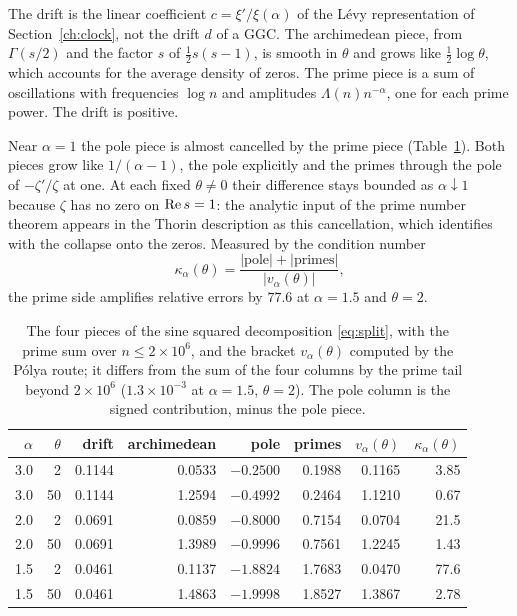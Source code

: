 The drift is the linear coefficient $c=\xi'/\xi(\alpha)$ of the L\'evy representation of Section~\ref{ch:clock}, not the drift $d$ of a GGC. The archimedean piece, from $\Gamma(s/2)$ and the factor $s$ of $\frac12s(s-1)$, is smooth in $\theta$ and grows like $\frac12\log\theta$, which accounts for the average density of zeros. The prime piece is a sum of oscillations with frequencies $\log n$ and amplitudes $\Lambda(n)n^{-\alpha}$, one for each prime power. The drift is positive.

Near $\alpha=1$ the pole piece is almost cancelled by the prime piece (Table~\ref{tab:split}). Both pieces grow like $1/(\alpha-1)$, the pole explicitly and the primes through the pole of $-\zeta'/\zeta$ at one. At each fixed $\theta\ne0$ their difference stays bounded as $\alpha\downarrow1$ because $\zeta$ has no zero on $\operatorname{Re} s=1$: the analytic input of the prime number theorem appears in the Thorin description as this cancellation, which \cite[Section 8.2]{P26} identifies with the collapse onto the zeros. Measured by the condition number
\[
\kappa_\alpha(\theta)=\frac{|\text{pole}|+|\text{primes}|}{|v_\alpha(\theta)|},
\]
the prime side amplifies relative errors by $77.6$ at $\alpha=1.5$ and $\theta=2$.

\begin{table}[t]
\centering\small
\begin{tabular}{rrrrrrrr}
\toprule
$\alpha$ & $\theta$ & drift & archimedean & pole & primes & $v_\alpha(\theta)$ & $\kappa_\alpha(\theta)$\\
\midrule
3.0 & 2 & 0.1144 & 0.0533 & $-0.2500$ & 0.1988 & 0.1165 & 3.85\\
3.0 & 50 & 0.1144 & 1.2594 & $-0.4992$ & 0.2464 & 1.1210 & 0.67\\
2.0 & 2 & 0.0691 & 0.0859 & $-0.8000$ & 0.7154 & 0.0704 & 21.5\\
2.0 & 50 & 0.0691 & 1.3989 & $-0.9996$ & 0.7561 & 1.2245 & 1.43\\
1.5 & 2 & 0.0461 & 0.1137 & $-1.8824$ & 1.7683 & 0.0470 & 77.6\\
1.5 & 50 & 0.0461 & 1.4863 & $-1.9998$ & 1.8527 & 1.3867 & 2.78\\
\bottomrule
\end{tabular}
\caption{The four pieces of the sine squared decomposition \eqref{eq:split}, with the prime sum over $n\le2\times10^6$, and the bracket $v_\alpha(\theta)$ computed by the P\'olya route; it differs from the sum of the four columns by the prime tail beyond $2\times10^6$ ($1.3\times10^{-3}$ at $\alpha=1.5$, $\theta=2$). The pole column is the signed contribution, minus the pole piece.}
\label{tab:split}
\end{table}

